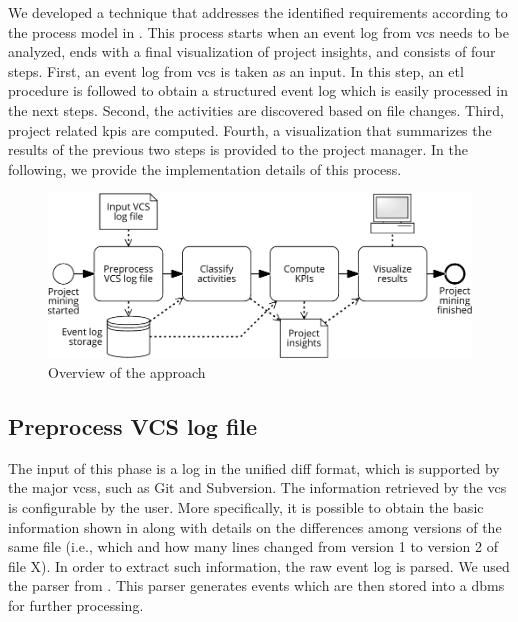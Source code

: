 

We developed a technique that addresses the identified requirements according to the process model in . 
This process starts when an event log from \gls{vcs} needs to be analyzed, ends with a final visualization of project insights, and consists of four steps.
First, an event log from \gls{vcs} is taken as an input. In this step, an \gls{etl} procedure is followed to obtain a structured event log which is easily processed in the next steps. Second, the activities are discovered based on file changes. Third, project related \glspl{kpi} are computed. Fourth, a visualization that summarizes the results of the previous two steps is provided to the project manager. In the following, we provide the implementation details of this process.

\begin{figure}[]
    \centering
    \includegraphics[width=.9\textwidth]{Project-mining-2-Mining-Type-of-Work/figures/overview}
    \caption{Overview of the approach}
    \label{fig:approach-overview}
\end{figure}




\subsection{Preprocess VCS log file}

The input of this phase is a log in the unified diff format, which is supported
by the major \glspl{vcs}, such as Git and Subversion. The information retrieved by the \gls{vcs} is configurable by the user. More specifically, it is possible to obtain the basic information shown in  along with details on the differences among versions of the same file (i.e., which and how many lines changed from version 1 to version 2 of file X). In order to extract such information, the raw event log is parsed. We used the parser from  \citep{DBLP:conf/bpm/BalaRGBMS17}. This parser generates events which are then stored into a \gls{dbms} for further processing. 

